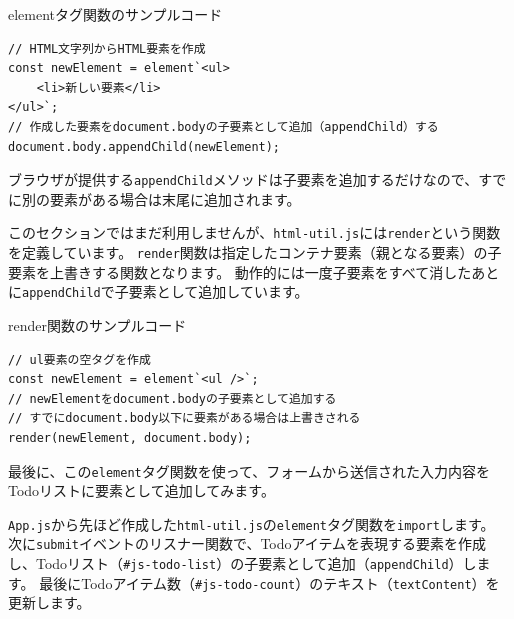 \begin{listtitle}
elementタグ関数のサンプルコード
\end{listtitle}
\begin{lstlisting}
// HTML文字列からHTML要素を作成
const newElement = element`<ul>
    <li>新しい要素</li>
</ul>`;
// 作成した要素をdocument.bodyの子要素として追加（appendChild）する
document.body.appendChild(newElement);
\end{lstlisting}
\listend

ブラウザが提供する\texttt{appendChild}メソッドは子要素を追加するだけなので、すでに別の要素がある場合は末尾に追加されます。

このセクションではまだ利用しませんが、\texttt{html-util.js}には\texttt{render}という関数を定義しています。
\texttt{render}関数は指定したコンテナ要素（親となる要素）の子要素を上書きする関数となります。
動作的には一度子要素をすべて消したあとに\texttt{appendChild}で子要素として追加しています。

\begin{listtitle}
render関数のサンプルコード
\end{listtitle}
\begin{lstlisting}
// ul要素の空タグを作成
const newElement = element`<ul />`;
// newElementをdocument.bodyの子要素として追加する
// すでにdocument.body以下に要素がある場合は上書きされる
render(newElement, document.body);
\end{lstlisting}
\listend

最後に、この\texttt{element}タグ関数を使って、フォームから送信された入力内容をTodoリストに要素として追加してみます。

\texttt{App.js}から先ほど作成した\texttt{html-util.js}の\texttt{element}タグ関数を\texttt{import}します。
次に\texttt{submit}イベントのリスナー関数で、Todoアイテムを表現する要素を作成し、Todoリスト（\texttt{\#js-todo-list}）の子要素として追加（\texttt{appendChild}）します。
最後にTodoアイテム数（\texttt{\#js-todo-count}）のテキスト（\texttt{textContent}）を更新します。

